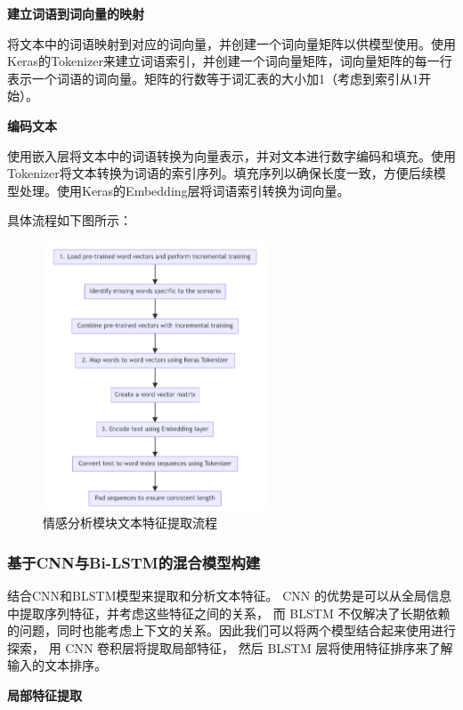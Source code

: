 \documentclass[UTF8,a4paper,15pt,titlepage,oneside]{ctexbook}
\begin{document}
\vskip 0.2cm
\noindent
\textbf{建立词语到词向量的映射}

将文本中的词语映射到对应的词向量，并创建一个词向量矩阵以供模型使用。使用Keras的Tokenizer来建立词语索引，并创建一个词向量矩阵，词向量矩阵的每一行表示一个词语的词向量。矩阵的行数等于词汇表的大小加1（考虑到索引从1开始）。

\vskip 0.2cm
\noindent
\textbf{编码文本}

使用嵌入层将文本中的词语转换为向量表示，并对文本进行数字编码和填充。使用Tokenizer将文本转换为词语的索引序列。填充序列以确保长度一致，方便后续模型处理。使用Keras的Embedding层将词语索引转换为词向量。

具体流程如下图所示：

\begin{figure}[H]
  \centering
  \includegraphics[width=0.6\textwidth,keepaspectratio=false]{pictures/8.png} %
  \caption{情感分析模块文本特征提取流程}
\end{figure}

\subsubsection{基于CNN与Bi-LSTM的混合模型构建}

结合CNN和BLSTM模型来提取和分析文本特征。
CNN 的优势是可以从全局信息中提取序列特征，并考虑这些特征之间的关系， 
而 BLSTM 不仅解决了长期依赖的问题，同时也能考虑上下文的关系。因此我们可以将两个模型结合起来使用进行探索，
用 CNN 卷积层将提取局部特征，
然后 BLSTM 层将使用特征排序来了解输入的文本排序。

\vskip 0.2cm
\noindent
\textbf{局部特征提取}
\end{document}
